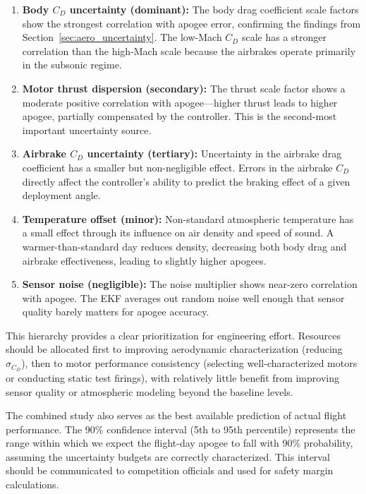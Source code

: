 \documentclass[11pt,letterpaper]{article}
\newcommand{\Cd}{C_D}
\begin{document}
\begin{enumerate}[nosep]
    \item \textbf{Body $\Cd$ uncertainty (dominant):} The body drag coefficient scale factors show the strongest correlation with apogee error, confirming the findings from Section~\ref{sec:aero_uncertainty}. The low-Mach $\Cd$ scale has a stronger correlation than the high-Mach scale because the airbrakes operate primarily in the subsonic regime.

    \item \textbf{Motor thrust dispersion (secondary):} The thrust scale factor shows a moderate positive correlation with apogee---higher thrust leads to higher apogee, partially compensated by the controller. This is the second-most important uncertainty source.

    \item \textbf{Airbrake $\Cd$ uncertainty (tertiary):} Uncertainty in the airbrake drag coefficient has a smaller but non-negligible effect. Errors in the airbrake $\Cd$ directly affect the controller's ability to predict the braking effect of a given deployment angle.

    \item \textbf{Temperature offset (minor):} Non-standard atmospheric temperature has a small effect through its influence on air density and speed of sound. A warmer-than-standard day reduces density, decreasing both body drag and airbrake effectiveness, leading to slightly higher apogees.

    \item \textbf{Sensor noise (negligible):} The noise multiplier shows near-zero correlation with apogee. The EKF averages out random noise well enough that sensor quality barely matters for apogee accuracy.
\end{enumerate}

This hierarchy provides a clear prioritization for engineering effort. Resources should be allocated first to improving aerodynamic characterization (reducing $\sigma_{\Cd}$), then to motor performance consistency (selecting well-characterized motors or conducting static test firings), with relatively little benefit from improving sensor quality or atmospheric modeling beyond the baseline levels.

The combined study also serves as the best available prediction of actual flight performance. The 90\% confidence interval (5th to 95th percentile) represents the range within which we expect the flight-day apogee to fall with 90\% probability, assuming the uncertainty budgets are correctly characterized. This interval should be communicated to competition officials and used for safety margin calculations.
\end{document}
